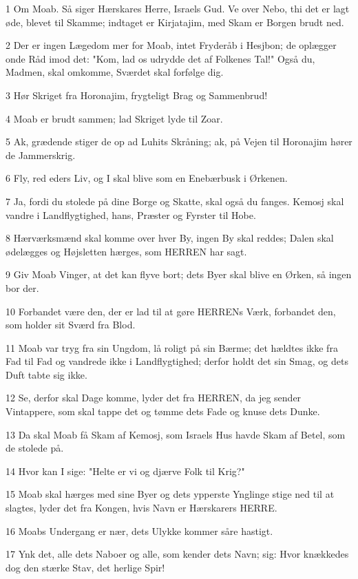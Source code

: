 \par 1 Om Moab. Så siger Hærskares Herre, Israels Gud. Ve over Nebo, thi det er lagt øde, blevet til Skamme; indtaget er Kirjatajim, med Skam er Borgen brudt ned.
\par 2 Der er ingen Lægedom mer for Moab, intet Fryderåb i Hesjbon; de oplægger onde Råd imod det: "Kom, lad os udrydde det af Folkenes Tal!" Også du, Madmen, skal omkomme, Sværdet skal forfølge dig.
\par 3 Hør Skriget fra Horonajim, frygteligt Brag og Sammenbrud!
\par 4 Moab er brudt sammen; lad Skriget lyde til Zoar.
\par 5 Ak, grædende stiger de op ad Luhits Skråning; ak, på Vejen til Horonajim hører de Jammerskrig.
\par 6 Fly, red eders Liv, og I skal blive som en Enebærbusk i Ørkenen.
\par 7 Ja, fordi du stolede på dine Borge og Skatte, skal også du fanges. Kemosj skal vandre i Landflygtighed, hans, Præster og Fyrster til Hobe.
\par 8 Hærværksmænd skal komme over hver By, ingen By skal reddes; Dalen skal ødelægges og Højsletten hærges, som HERREN har sagt.
\par 9 Giv Moab Vinger, at det kan flyve bort; dets Byer skal blive en Ørken, så ingen bor der.
\par 10 Forbandet være den, der er lad til at gøre HERRENs Værk, forbandet den, som holder sit Sværd fra Blod.
\par 11 Moab var tryg fra sin Ungdom, lå roligt på sin Bærme; det hældtes ikke fra Fad til Fad og vandrede ikke i Landflygtighed; derfor holdt det sin Smag, og dets Duft tabte sig ikke.
\par 12 Se, derfor skal Dage komme, lyder det fra HERREN, da jeg sender Vintappere, som skal tappe det og tømme dets Fade og knuse dets Dunke.
\par 13 Da skal Moab få Skam af Kemosj, som Israels Hus havde Skam af Betel, som de stolede på.
\par 14 Hvor kan I sige: "Helte er vi og djærve Folk til Krig?"
\par 15 Moab skal hærges med sine Byer og dets ypperste Ynglinge stige ned til at slagtes, lyder det fra Kongen, hvis Navn er Hærskarers HERRE.
\par 16 Moabs Undergang er nær, dets Ulykke kommer såre hastigt.
\par 17 Ynk det, alle dets Naboer og alle, som kender dets Navn; sig: Hvor knækkedes dog den stærke Stav, det herlige Spir!
